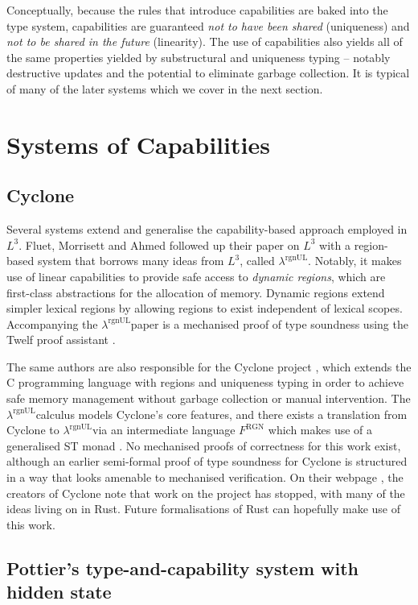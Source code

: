 \documentclass[]{unswthesis}
\newcommand{\rgnUL}{$\lambda^\text{rgnUL}$\text{ }}
\let\i\textit
\begin{document}
Conceptually, because the rules that introduce capabilities are baked into the type system, capabilities are guaranteed \i{not to have been shared} (uniqueness) and \i{not to be shared in the future} (linearity). The use of capabilities also yields all of the same properties yielded by substructural and uniqueness typing -- notably destructive updates and the potential to eliminate garbage collection. It is typical of many of the later systems which we cover in the next section.

\section{Systems of Capabilities}

\subsection{Cyclone}

Several systems extend and generalise the capability-based approach employed in $L^3$. Fluet, Morrisett and Ahmed followed up their paper on $L^3$ with a region-based system that borrows many ideas from $L^3$, called \rgnUL \cite{fluet06}. Notably, it makes use of linear capabilities to provide safe access to \i{dynamic regions}, which are first-class abstractions for the allocation of memory. Dynamic regions extend simpler lexical regions by allowing regions to exist independent of lexical scopes. Accompanying the \rgnUL paper is a mechanised proof of type soundness using the Twelf proof assistant \cite{pfenning99}.

The same authors are also responsible for the Cyclone project \cite{grossman05}, which extends the C programming language with regions and uniqueness typing in order to achieve safe memory management without garbage collection or manual intervention. The \rgnUL calculus models Cyclone's core features, and there exists a translation from Cyclone to \rgnUL via an intermediate language $F^\text{RGN}$ which makes use of a generalised ST monad \cite{fluet06, fluet04}. No mechanised proofs of correctness for this work exist, although an earlier semi-formal proof of type soundness for Cyclone \cite{jim01} is structured in a way that looks amenable to mechanised verification. On their webpage \cite{cycloneWeb}, the creators of Cyclone note that work on the project has stopped, with many of the ideas living on in Rust. Future formalisations of Rust can hopefully make use of this work.

\subsection{Pottier's type-and-capability system with hidden state}
\end{document}

